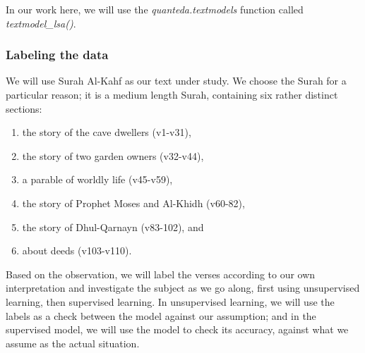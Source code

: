 \documentclass[
]{article}
\providecommand{\tightlist}{%
  \setlength{\itemsep}{0pt}\setlength{\parskip}{0pt}}
\begin{document}
In our work here, we will use the \emph{quanteda.textmodels} function called \emph{textmodel\_lsa()}.

\hypertarget{labeling-the-data}{%
\subsubsection{Labeling the data}\label{labeling-the-data}}

We will use Surah Al-Kahf as our text under study. We choose the Surah for a particular reason; it is a medium length Surah, containing six rather distinct sections:

\begin{enumerate}
\def\labelenumi{\arabic{enumi})}
\tightlist
\item
  the story of the cave dwellers (v1-v31),
\item
  the story of two garden owners (v32-v44),
\item
  a parable of worldly life (v45-v59),
\item
  the story of Prophet Moses and Al-Khidh (v60-82),
\item
  the story of Dhul-Qarnayn (v83-102), and
\item
  about deeds (v103-v110).
\end{enumerate}

Based on the observation, we will label the verses according to our own interpretation and investigate the subject as we go along, first using unsupervised learning, then supervised learning. In unsupervised learning, we will use the labels as a check between the model against our assumption; and in the supervised model, we will use the model to check its accuracy, against what we assume as the actual situation.

\footnotesize
\end{document}
